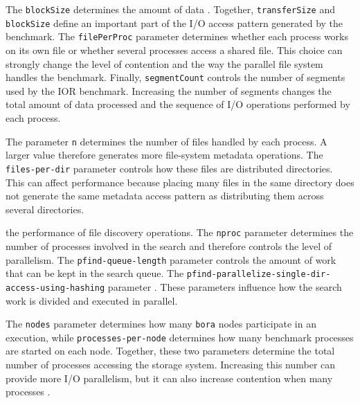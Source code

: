 The \texttt{blockSize} determines the amount of data .
Together, \texttt{transferSize} and \texttt{blockSize} define an important
part of the I/O access pattern generated by the benchmark. The
\texttt{filePerProc} parameter determines whether each process works on its
own file or whether several processes access a shared file. This choice
can strongly change the level of contention and the way the parallel file
system handles the benchmark. Finally, \texttt{segmentCount} controls the
number of segments used by the IOR benchmark. Increasing the number of
segments changes the total amount of data processed and the sequence of I/O
operations performed by each process.

The parameter \texttt{n} determines the number of files handled by each
process. A larger value therefore generates more file-system metadata
operations. The \texttt{files-per-dir} parameter controls how these files are distributed  directories. This can affect performance because
placing many files in the same directory does not generate the same
metadata access pattern as distributing them across several directories.

 the performance of file discovery operations.
The \texttt{nproc} parameter determines the number of processes involved
in the search and therefore controls the level of parallelism. The \texttt{pfind-queue-length} parameter controls the amount of work that
can be kept in the search queue. The
\texttt{pfind-parallelize-single-dir-access-using-hashing} parameter
. These parameters influence how the search work is divided and
executed in parallel.


 The \texttt{nodes} parameter determines how many
\texttt{bora} nodes participate in an execution, while
\texttt{processes-per-node} determines how many benchmark processes are
started on each node. Together, these two parameters determine the total number of processes
accessing the storage system. Increasing this number can provide more I/O
parallelism, but it can also increase contention when many processes .



